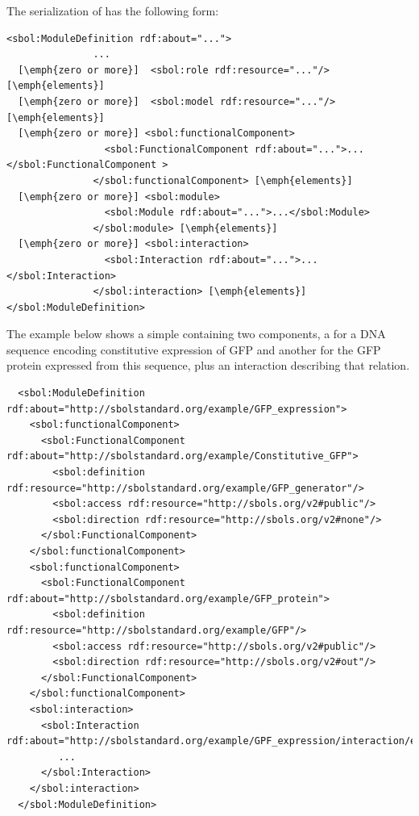 The serialization of  has the following form:
\begin{lstlisting}
<sbol:ModuleDefinition rdf:about="...">
               ...
  [\emph{zero or more}]  <sbol:role rdf:resource="..."/> [\emph{elements}]
  [\emph{zero or more}]  <sbol:model rdf:resource="..."/> [\emph{elements}]
  [\emph{zero or more}] <sbol:functionalComponent>
                 <sbol:FunctionalComponent rdf:about="...">...</sbol:FunctionalComponent >
               </sbol:functionalComponent> [\emph{elements}]
  [\emph{zero or more}] <sbol:module>
                 <sbol:Module rdf:about="...">...</sbol:Module>
               </sbol:module> [\emph{elements}]
  [\emph{zero or more}] <sbol:interaction>
                 <sbol:Interaction rdf:about="...">...</sbol:Interaction>
               </sbol:interaction> [\emph{elements}]
</sbol:ModuleDefinition>
\end{lstlisting}


The example below shows a simple  containing two components, a  for a DNA sequence encoding constitutive expression of GFP and another for the GFP protein expressed from this sequence, plus an interaction describing that relation.

\begin{lstlisting}
  <sbol:ModuleDefinition rdf:about="http://sbolstandard.org/example/GFP_expression">
    <sbol:functionalComponent>
      <sbol:FunctionalComponent rdf:about="http://sbolstandard.org/example/Constitutive_GFP">
        <sbol:definition rdf:resource="http://sbolstandard.org/example/GFP_generator"/>
        <sbol:access rdf:resource="http://sbols.org/v2#public"/>
        <sbol:direction rdf:resource="http://sbols.org/v2#none"/>
      </sbol:FunctionalComponent>
    </sbol:functionalComponent>
    <sbol:functionalComponent>
      <sbol:FunctionalComponent rdf:about="http://sbolstandard.org/example/GFP_protein">
        <sbol:definition rdf:resource="http://sbolstandard.org/example/GFP"/>
        <sbol:access rdf:resource="http://sbols.org/v2#public"/>
        <sbol:direction rdf:resource="http://sbols.org/v2#out"/>
      </sbol:FunctionalComponent>
    </sbol:functionalComponent>
    <sbol:interaction>
      <sbol:Interaction rdf:about="http://sbolstandard.org/example/GPF_expression/interaction/express_GFP">
         ...
      </sbol:Interaction>
    </sbol:interaction>
  </sbol:ModuleDefinition>
\end{lstlisting}

